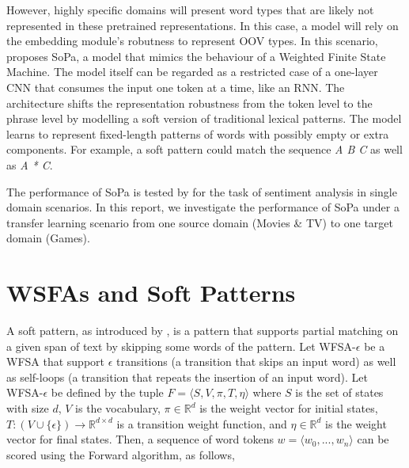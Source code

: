 \documentclass[11pt,a4paper]{article}
\begin{document}
However, highly specific domains will present word types that are likely not represented in these pretrained representations. In this case, a model will rely on the embedding module's robutness to represent OOV types. In this scenario, \cite{schwartz2018sopa} proposes {\sc SoPa}, a model that mimics the behaviour of a Weighted Finite State Machine. The model itself can be regarded as a restricted case of a one-layer CNN that consumes the input one token at a time, like an RNN. The architecture shifts the representation robustness from the token level to the phrase level by modelling a soft version of traditional lexical patterns. The model learns to represent fixed-length patterns of words with possibly empty or extra components. For example, a soft pattern could match  the sequence {\it A B C} as well as {\it A * C}.

The performance of {\sc SoPa} is tested by \citet{schwartz2018sopa} for the task of sentiment analysis in single domain scenarios. In this report, we investigate the performance of  {\sc SoPa} under a transfer learning scenario from one source domain (Movies \& TV) to one target domain (Games).


\section{WSFAs and Soft Patterns}

A soft pattern, as introduced by \citet{davidov2010enhanced}, is a pattern that supports partial matching on a given span of text by skipping some words of the pattern.
Let WFSA-$\epsilon$ be a WFSA that support $\epsilon$ transitions (a transition that skips an input word) as well as self-loops (a transition that repeats the insertion of an input word).
Let WFSA-$\epsilon$ be defined by the tuple $F = \langle S,V,\pi, T, \eta \rangle$ where $S$ is the set of states with size $d$, $V$ is the vocabulary, $ \pi \in \mathbb{R}^d $ is the weight vector for initial states, $T: (V \cup \{\epsilon\} ) \to \mathbb{R}^{d \times d}$ is a transition weight function, and $\eta \in \mathbb{R}^d$ is the weight vector for final states.
Then, a sequence of word tokens $w=\langle w_0,...,w_n \rangle$ can be scored using the Forward algorithm, as follows,
\end{document}
